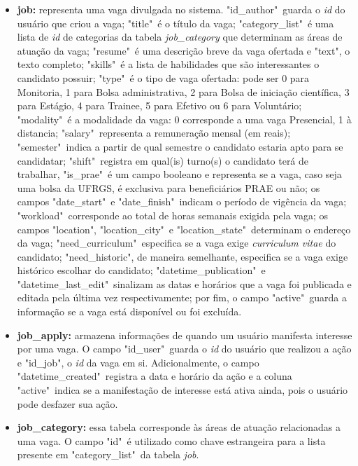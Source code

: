 \begin{itemize}
    \item \textbf{job:} representa uma vaga divulgada no sistema. "id\_author"\ guarda o \textit{id} do usuário que criou a vaga; "title"\ é o título da vaga; "category\_list"\ é uma lista de \textit{id} de categorias da tabela \textit{job\_category} que determinam as áreas de atuação da vaga; "resume"\ é uma descrição breve da vaga ofertada e "text", o texto completo; "skills"\ é a lista de habilidades que são interessantes o candidato possuir; "type"\ é o tipo de vaga ofertada: pode ser 0 para Monitoria, 1 para Bolsa administrativa, 2 para Bolsa de iniciação científica, 3 para Estágio, 4 para Trainee, 5 para Efetivo ou 6 para Voluntário; "modality"\ é a modalidade da vaga: 0 corresponde a uma vaga Presencial, 1 à distancia; "salary"\ representa a remuneração mensal (em reais); "semester"\ indica a partir de qual semestre o candidato estaria apto para se candidatar; "shift"\ registra em qual(is)  turno(s) o candidato terá de trabalhar, "is\_prae"\ é um campo booleano e representa se a vaga, caso seja uma bolsa da UFRGS, é exclusiva para beneficiários PRAE ou não; os campos "date\_start"\ e "date\_finish"\ indicam o período de vigência da vaga; "workload"\ corresponde ao total de horas semanais exigida pela vaga; os campos "location", "location\_city"\ e "location\_state"\ determinam o endereço da vaga; "need\_curriculum"\ especifica se a vaga exige \textit{curriculum vitae} do candidato; "need\_historic", de maneira semelhante, especifica se a vaga exige histórico escolhar do candidato; "datetime\_publication"\ e "datetime\_last\_edit"\ sinalizam as datas e horários que a vaga foi publicada e editada pela última vez respectivamente; por fim, o campo "active"\ guarda a informação se a vaga está disponível ou foi excluída.
    
    \item \textbf{job\_apply:} armazena informações de quando um usuário manifesta interesse por uma vaga. O campo "id\_user"\ guarda o \textit{id} do usuário que realizou a ação e "id\_job", o \textit{id} da vaga em si. Adicionalmente, o campo "datetime\_created"\ registra a data e horário da ação e a coluna "active"\ indica se a manifestação de interesse está ativa ainda, pois o usuário pode desfazer sua ação.
    
    \item \textbf{job\_category:} essa tabela corresponde às áreas de atuação relacionadas a uma vaga. O campo "id"\ é utilizado como chave estrangeira para a lista presente em "category\_list"\ da tabela \textit{job}. 
    

\end{itemize}
